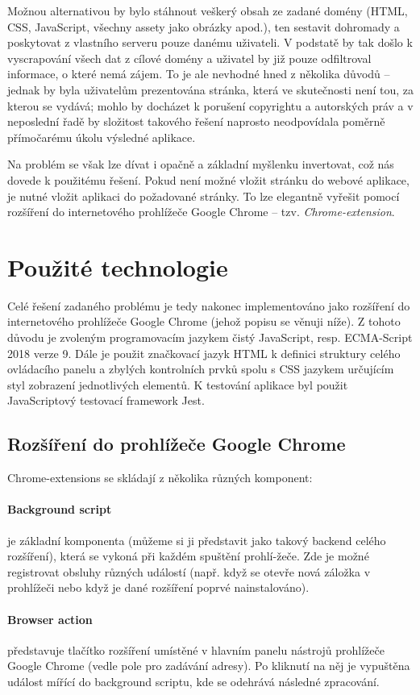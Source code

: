 \documentclass[thesis=B,czech]{FITthesis}[2012/06/26]
\begin{document}
Možnou alternativou by bylo stáhnout veškerý obsah ze zadané domény (HTML, CSS, JavaScript, všechny assety jako obrázky apod.), ten sestavit dohromady a poskytovat z vlastního serveru pouze danému uživateli. V podstatě by tak došlo k vyscrapování všech dat z cílové domény a uživatel by již pouze odfiltroval informace, o které nemá zájem. To je ale nevhodné hned z několika důvodů -- jednak by byla uživatelům prezentována stránka, která ve skutečnosti není tou, za kterou se vydává; mohlo by docházet k porušení copyrightu a autorských práv a v neposlední řadě by složitost takového řešení naprosto neodpovídala poměrně přímočarému úkolu výsledné aplikace.

Na problém se však lze dívat i opačně a základní myšlenku invertovat, což nás dovede k použitému řešení. Pokud není možné vložit stránku do webové aplikace, je nutné vložit aplikaci do požadované stránky. To lze elegantně vyřešit pomocí rozšíření do internetového prohlížeče Google Chrome -- tzv. \emph{Chrome-extension}.

\section{Použité technologie}	
Celé řešení zadaného problému je tedy nakonec implementováno jako rozšíření do internetového prohlížeče Google Chrome (jehož popisu se věnuji níže). Z tohoto důvodu je zvoleným programovacím jazykem čistý JavaScript, resp. ECMA-Script 2018 verze 9. Dále je použit značkovací jazyk HTML k definici struktury celého ovládacího panelu a zbylých kontrolních prvků spolu s CSS jazykem určujícím styl zobrazení jednotlivých elementů. K testování aplikace byl použit JavaScriptový testovací framework Jest.

\subsection{Rozšíření do prohlížeče Google Chrome}
Chrome-extensions se skládají z několika různých komponent:
\paragraph{Background script} je základní komponenta (můžeme si ji představit jako takový backend celého rozšíření), která se vykoná při každém spuštění prohlí-žeče. Zde je možné registrovat obsluhy různých událostí (např. když se otevře nová záložka v prohlížeči nebo když je dané rozšíření poprvé nainstalováno). 
\paragraph{Browser action} představuje tlačítko rozšíření umístěné v hlavním panelu nástrojů prohlížeče Google Chrome (vedle pole pro zadávání adresy). Po kliknutí na něj je vypuštěna událost mířící do background scriptu, kde se odehrává následné zpracování.
\end{document}
